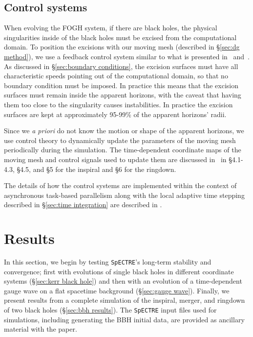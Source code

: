 \documentclass[12pt]{caltech_thesis}
\begin{document}
\begin{bibunit}[unsrtnat]
\subsection{Control systems\label{sec:control systems}} When evolving the FOGH
system, if there are black holes, the physical singularities inside of the black
holes must be excised from the computational domain. To position the excisions
with our moving mesh (described in \S\ref{sec:dg method}), we use a feedback
control system similar to what is presented in~\cite{Scheel:2006gg}
and~\cite{Hemberger:2012jz}. As discussed in \S\ref{sec:boundary conditions},
the excision surfaces must have all characteristic speeds pointing out of the
computational domain, so that no boundary condition must be imposed. In practice
this means that the excision surfaces must remain inside the apparent horizons,
with the caveat that having them too close to the singularity causes
instabilities. In practice the excision surfaces are kept at approximately
95-99\% of the apparent horizons' radii.

Since we \textit{a priori} do not know the motion or shape of the apparent
horizons, we use control theory to dynamically update the parameters of
the moving mesh periodically during the simulation. The time-dependent
coordinate maps of the moving mesh and control
signals used to update them are discussed in~\cite{Hemberger:2012jz} in
\S 4.1-4.3, \S 4.5, and \S 5 for the inspiral and \S 6 for the ringdown.

The details of how the control systems are implemented within the context of
asynchronous task-based parallelism along with the local adaptive time stepping
described in \S\ref{sec:time integration} are described in
\cite{Nelli:2025inprep}.

\section{Results\label{sec:results}}

In this section, we begin by testing \texttt{SpECTRE}'s long-term stability and
convergence; first with evolutions of single black holes in different coordinate
systems (\S\ref{sec:kerr black hole}) and then with an evolution of a
time-dependent gauge wave on a flat spacetime background (\S\ref{sec:gauge
wave}). Finally, we present results from a complete simulation of the inspiral,
merger, and ringdown of two black holes (\S\ref{sec:bbh results}). The
\texttt{SpECTRE} input files used for simulations, including generating the BBH
initial data, are provided as ancillary material with the paper.


\end{bibunit}
\end{document}
